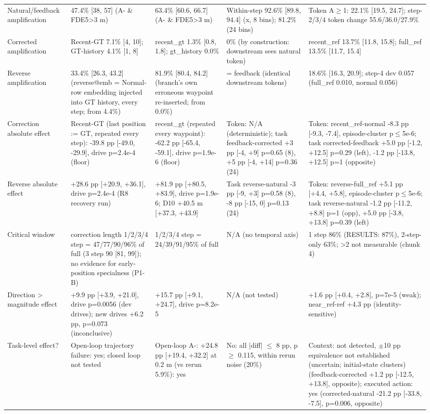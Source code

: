\begin{table}[t]
{\begin{tabular}{p{2.6cm}p{3.6cm}p{3.6cm}p{3.6cm}p{4.2cm}}
Natural/feedback amplification & 47.4\% [38, 57] (A- \& FDE5>3 m) & 63.4\% [60.6, 66.7] (A- \& FDE5>3 m) & Within-step 92.6\% [89.8, 94.4] (x, 8 bins); 81.2\% (24 bins) & Token A$\ge$1: 22.1\% [19.5, 24.7]; step-2/3/4 token change 55.6/36.0/27.9\% \\
Corrected amplification & Recent-GT 7.1\% [4, 10]; GT-history 4.1\% [1, 8] & recent\_gt 1.3\% [0.8, 1.8]; gt\_history 0.0\% & 0\% (by construction: downstream sees natural token) & recent\_ref 13.7\% [11.8, 15.8]; full\_ref 13.5\% [11.7, 15.4] \\
Reverse amplification & 33.4\% [26.3, 43.2] (reverse@emb = Normal-row embedding injected into GT history, every step; from 4.4\%) & 81.9\% [80.4, 84.2] (branch's own erroneous waypoint re-inserted; from 0.0\%) & = feedback (identical downstream tokens) & 18.6\% [16.3, 20.9]; step-4 dev 0.057 (full\_ref 0.010, normal 0.056) \\
Correction absolute effect & Recent-GT (last position := GT, repeated every step): -39.8 pp [-49.0, -29.9], drive p=2.4e-4 (floor) & recent\_gt (repeated every waypoint): -62.2 pp [-65.4, -59.1], drive p=1.9e-6 (floor) & Token: N/A (deterministic); task feedback-corrected +3 pp [-4, +9] p=0.65 (8), +5 pp [-4, +14] p=0.36 (24) & Token: recent\_ref-normal -8.3 pp [-9.3, -7.4], episode-cluster p$\le$5e-6; task corrected-feedback +5.0 pp [-1.2, +12.5] p=0.29 (left), -1.2 pp [-13.8, +12.5] p=1 (opposite) \\
Reverse absolute effect & +28.6 pp [+20.9, +36.1], drive p=2.4e-4 (R8 recovery run) & +81.9 pp [+80.5, +83.9], drive p=1.9e-6; D10 +40.5 m [+37.3, +43.9] & Task reverse-natural -3 pp [-9, +3] p=0.58 (8), -8 pp [-15, 0] p=0.13 (24) & Token: reverse-full\_ref +5.1 pp [+4.4, +5.8], episode-cluster p$\le$5e-6; task reverse-natural -1.2 pp [-11.2, +8.8] p=1 (opp), +5.0 pp [-3.8, +13.8] p=0.39 (left) \\
Critical window & correction length 1/2/3/4 step = 47/77/90/96\% of full (3 step 90 [81, 99]); no evidence for early-position specialness (P1-B) & 1/2/3/4 step = 24/39/91/95\% of full & N/A (no temporal axis) & 1 step 86\% (RESULTS: 87\%), 2-step-only 63\%; >2 not measurable (chunk 4) \\
Direction > magnitude effect & +9.9 pp [+3.9, +21.0], drive p=0.0056 (dev drives); new drives +6.2 pp, p=0.073 (inconclusive) & +15.7 pp [+9.1, +24.7], drive p=8.2e-5 & N/A (not tested) & +1.6 pp [+0.4, +2.8], p=7e-5 (weak); near\_ref-ref +4.3 pp (identity-sensitive) \\
Task-level effect? & Open-loop trajectory failure: yes; closed loop not tested & Open-loop A-: +24.8 pp [+19.4, +32.2] at 0.2 m (vs rerun 5.9\%): yes & No: all |diff| $\le$ 8 pp, p $\ge$ 0.115, within rerun noise (20\%) & Context: not detected, $\pm$10 pp equivalence not established (uncertain; initial-state clusters) (feedback-corrected +1.2 pp [-12.5, +13.8], opposite); executed action: yes (corrected-natural -21.2 pp [-33.8, -7.5], p=0.006, opposite) \\

\end{tabular}}
\end{table}
